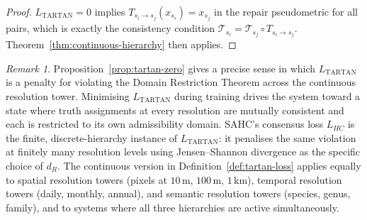 \documentclass[12pt, oneside]{article}
\theoremstyle{plain}
\theoremstyle{definition}
\theoremstyle{remark}
\newtheorem{remark}[theorem]{Remark}
\newcommand{\Tsub}{\mathcal{T}}
\begin{document}
\begin{proof}
  $L_{\mathrm{TARTAN}} = 0$ implies $T_{s_i \to s_j}(x_{s_i}) =
  x_{s_j}$ in the repair pseudometric for all pairs, which is
  exactly the consistency condition $\Tsub_{s_i} = \Tsub_{s_j}
  \circ T_{s_i \to s_j}$.
  Theorem~\ref{thm:continuous-hierarchy} then applies.
\end{proof}

\begin{remark}
  Proposition~\ref{prop:tartan-zero} gives a precise sense in which
  $L_{\mathrm{TARTAN}}$ is a penalty for violating the Domain
  Restriction Theorem across the continuous resolution tower.
  Minimising $L_{\mathrm{TARTAN}}$ during training drives the
  system toward a state where truth assignments at every resolution
  are mutually consistent and each is restricted to its own
  admissibility domain.
  SAHC's consensus loss $L_{HC}$ is the finite, discrete-hierarchy
  instance of $L_{\mathrm{TARTAN}}$: it penalises the same
  violation at finitely many resolution levels using Jensen--Shannon
  divergence as the specific choice of $d_R$.
  The continuous version in Definition~\ref{def:tartan-loss} applies
  equally to spatial resolution towers (pixels at $10\,\mathrm{m}$,
  $100\,\mathrm{m}$, $1\,\mathrm{km}$), temporal resolution towers
  (daily, monthly, annual), and semantic resolution towers
  (species, genus, family), and to systems where all three
  hierarchies are active simultaneously.
\end{remark}
\end{document}
